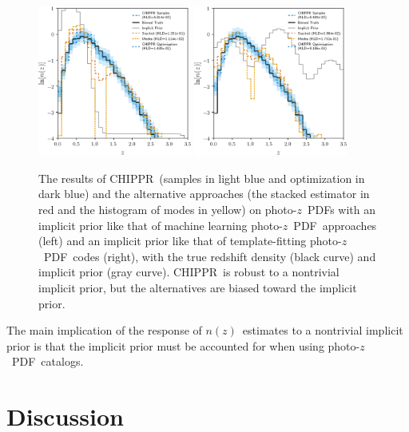 \documentclass[iop]{emulateapj}
\newcommand{\todo}[3]{{\color{#2}\emph{#1}: #3}}
\newcommand{\aim}[1]{\todo{AIM}{red}{#1}}
\newcommand{\Sect}[1]{Section~\ref{#1}}
\newcommand{\project}[1]{{\textsc{#1}}}
\newcommand{\Chippr}{\project{CHIPPR}}
\newcommand{\nz}{$n(z)$}
\newcommand{\pz}{photo-$z$~}
\newcommand{\pzpdf}{\pz PDF}
\begin{document}
\begin{figure}
	\begin{center}
	\includegraphics[width=0.45\textwidth]{figures/chippr/results_trpr.png}
	\includegraphics[width=0.45\textwidth]{figures/chippr/results_tmpr.png}
	\caption{
		The results of \Chippr\ (samples in light blue and optimization in dark blue) and the alternative approaches (the stacked estimator in red and the histogram of modes in yellow) on \pzpdf s with an implicit prior like that of machine learning \pzpdf\ approaches (left) and an implicit prior like that of template-fitting \pzpdf\ codes (right), with the true redshift density (black curve) and implicit prior (gray curve).
		\Chippr\ is robust to a nontrivial implicit prior, but the alternatives are biased toward the implicit prior.
	}
	\label{fig:results-priors}
	\end{center}
\end{figure}


The main implication of the response of \nz\ estimates to a nontrivial implicit prior is that the implicit prior must be accounted for when using \pzpdf\ catalogs.

\section{Discussion}
\label{sec:results}
\end{document}
